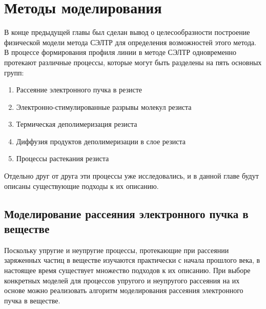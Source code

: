 \chapter{Методы моделирования}

В конце предыдущей главы был сделан вывод о целесообразности построение физической модели метода СЭЛТР для определения возможностей этого метода. В процессе формирования профиля линии в методе СЭЛТР одновременно протекают различные процессы, которые могут быть разделены на пять основных групп:
\begin{enumerate}
	\item Рассеяние электронного пучка в резисте
	\item Электронно-стимулированные разрывы молекул резиста
	\item Термическая деполимеризация резиста
	\item Диффузия продуктов деполимеризации в слое резиста
	\item Процессы растекания резиста
\end{enumerate}

Отдельно друг от друга эти процессы уже исследовались, и в данной главе будут описаны существующие подходы к их описанию.


\section{Моделирование рассеяния электронного пучка в веществе}
Поскольку упругие и неупругие процессы, протекающие при рассеянии заряженных частиц в веществе изучаются практически с начала прошлого века, в настоящее время существует множество подходов к их описанию. При выборе конкретных моделей для процессов упругого и неупругого рассеяния на их основе можно реализовать алгоритм моделирования рассеяния электронного пучка в веществе.









